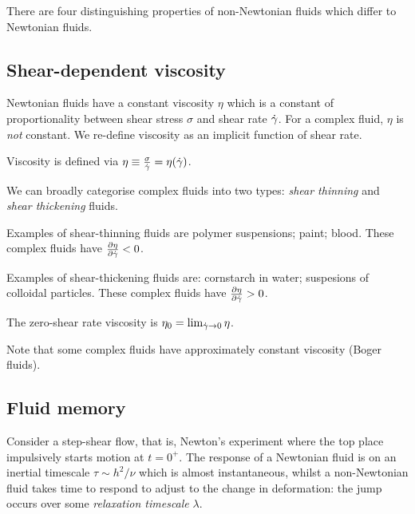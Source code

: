 \documentclass{jknotes}
\begin{document}
There are four distinguishing properties of non-Newtonian fluids which differ
to Newtonian fluids.

\subsection{Shear-dependent viscosity}
Newtonian fluids have a constant viscosity $\eta$ which is a constant of
proportionality between shear stress $\sigma$ and shear rate $\dot{\gamma}$.
For a complex fluid, $\eta$ is \emph{not} constant. We re-define viscosity as
an implicit function of shear rate.
\begin{defn}
	Viscosity is defined via $\eta \equiv \frac{\sigma}{\dot{\gamma}} =
	\eta(\dot{\gamma})$.
\end{defn}

We can broadly categorise complex fluids into two types: \emph{shear thinning}
and \emph{shear thickening} fluids.

\begin{center}
\end{center}

Examples of shear-thinning fluids are polymer suspensions; paint; blood. These
complex fluids have $\frac{\partial \eta}{\partial \dot{\gamma}} < 0$.

Examples of shear-thickening fluids are: cornstarch in water; suspesions of
colloidal particles. These complex fluids have $\frac{\partial \eta}{\partial
\dot{\gamma}} > 0$.

\begin{defn}
	The zero-shear rate viscosity is $\eta_0 = \lim_{\dot{\gamma} \to 0}
	\eta$.
\end{defn}

Note that some complex fluids have approximately constant viscosity (Boger
fluids).

\subsection{Fluid memory}
Consider a step-shear flow, that is, Newton's experiment where the top place
impulsively starts motion at $t=0^+$. The response of a Newtonian fluid is on
an inertial timescale $\tau \sim h^2/\nu$ which is almost instantaneous,
whilst a non-Newtonian fluid takes time to respond to adjust to the change in
deformation: the jump occurs over some \emph{relaxation timescale} $\lambda$.
\end{document}

